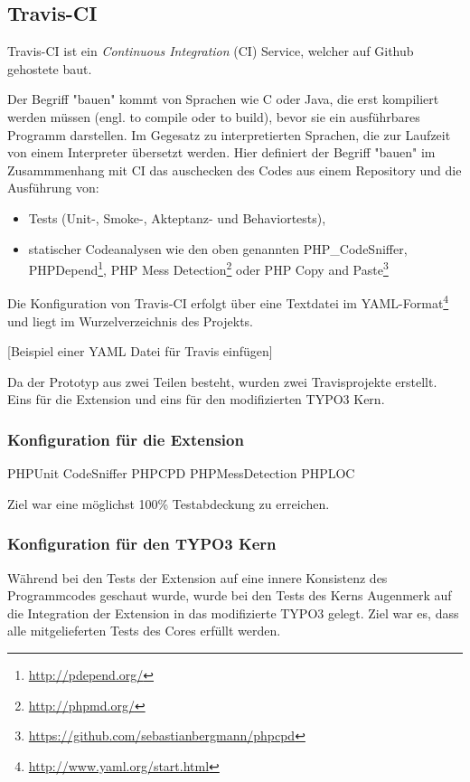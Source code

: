 \subsection{Travis-CI}
Travis-CI ist ein \textit{Continuous Integration} (CI) Service, welcher auf Github gehostete baut.

Der Begriff "bauen" kommt von Sprachen wie C oder Java, die erst kompiliert werden müssen (engl. to compile oder to build), bevor sie ein ausführbares Programm darstellen. Im Gegesatz zu interpretierten Sprachen, die zur Laufzeit von einem Interpreter übersetzt werden. Hier definiert der Begriff "bauen" im Zusammmenhang mit CI das auschecken des Codes aus einem Repository und die Ausführung von:

	\begin{itemize}
		\item Tests (Unit-, Smoke-, Akteptanz- und Behaviortests),
		\item statischer Codeanalysen wie den oben genannten PHP\_CodeSniffer, PHPDepend\footnote{\url{http://pdepend.org/}}, PHP Mess Detection\footnote{\url{http://phpmd.org/}} oder PHP Copy and Paste\footnote{\url{https://github.com/sebastianbergmann/phpcpd}}
	\end{itemize}

Die Konfiguration von Travis-CI erfolgt über eine Textdatei im YAML-Format\footnote{\url{http://www.yaml.org/start.html}} und liegt im Wurzelverzeichnis des Projekts.

[Beispiel einer YAML Datei für Travis einfügen]

Da der Prototyp aus zwei Teilen besteht, wurden zwei Travisprojekte erstellt. Eins für die Extension und eins für den modifizierten TYPO3 Kern.

\subsubsection{Konfiguration für die Extension}
PHPUnit
CodeSniffer
PHPCPD
PHPMessDetection
PHPLOC

Ziel war eine möglichst 100\% Testabdeckung zu erreichen.

\subsubsection{Konfiguration für den TYPO3 Kern}
Während bei den Tests der Extension auf eine innere Konsistenz des Programmcodes geschaut wurde, wurde bei den Tests des Kerns Augenmerk auf die Integration der Extension in das modifizierte TYPO3 gelegt. Ziel war es, dass alle mitgelieferten Tests des Cores erfüllt werden.

